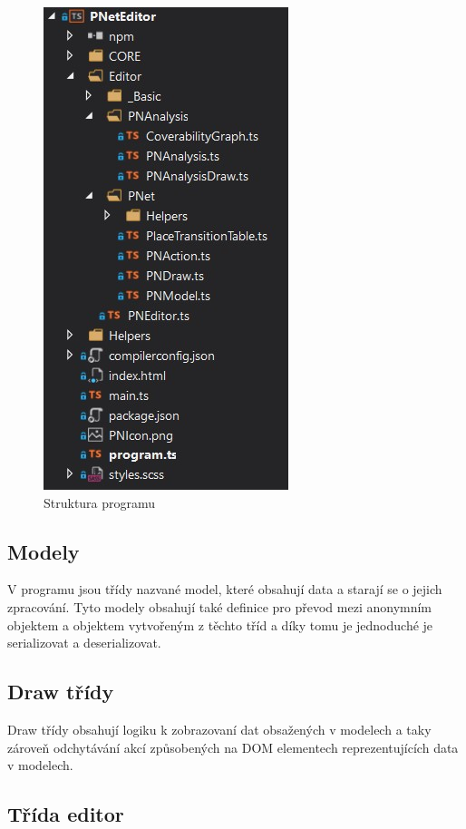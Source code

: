 \documentclass[
  biblatex,
  glossaries,
  printversion
]{kidiplom}
\begin{document}
\begin{figure}[h]
  \centering
  \includegraphics[scale=1]{struktura_programu}
  \caption{Struktura programu}\label{Struktura programu}
\end{figure}


\subsection{Modely}

V programu jsou třídy nazvané model, které obsahují data a 
starají se o jejich zpracování.
Tyto modely obsahují také definice pro 
převod mezi anonymním objektem a objektem 
vytvořeným z těchto tříd a díky tomu je 
jednoduché je serializovat a deserializovat.


\subsection{Draw třídy}

Draw třídy obsahují logiku k zobrazovaní dat obsažených v modelech a taky
zároveň odchytávání akcí způsobených na DOM elementech reprezentujících 
data v modelech.


\subsection{Třída editor}
\end{document}
